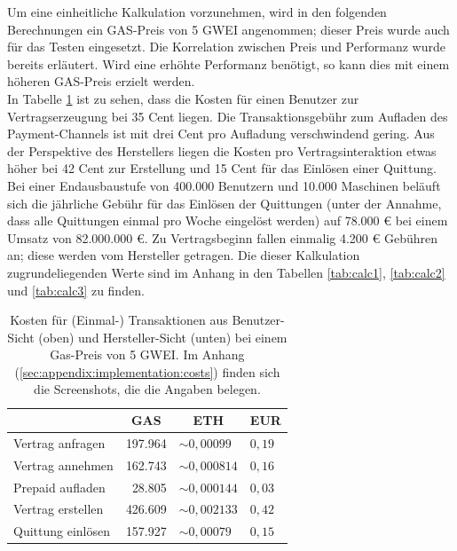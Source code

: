 Um eine einheitliche Kalkulation vorzunehmen, wird in den folgenden Berechnungen ein GAS-Preis von 5 GWEI angenommen; dieser Preis wurde auch für das Testen eingesetzt. Die Korrelation zwischen Preis und Performanz wurde bereits erläutert. Wird eine erhöhte Performanz benötigt, so kann dies mit einem höheren GAS-Preis erzielt werden.\\
In Tabelle \ref{tab:costs} ist zu sehen, dass die Kosten für einen Benutzer zur Vertragserzeugung bei 35 Cent liegen. Die Transaktionsgebühr zum Aufladen des Payment-Channels ist mit drei Cent pro Aufladung verschwindend gering. Aus der Perspektive des Herstellers liegen die Kosten pro Vertragsinteraktion etwas höher bei 42 Cent zur Erstellung und 15 Cent für das Einlösen einer Quittung. Bei einer Endausbaustufe von 400.000 Benutzern und 10.000 Maschinen beläuft sich die jährliche Gebühr für das Einlösen der Quittungen (unter der Annahme, dass alle Quittungen einmal pro Woche eingelöst werden) auf 78.000 € bei einem Umsatz von 82.000.000 €. Zu Vertragsbeginn fallen einmalig 4.200 € Gebühren an; diese werden vom Hersteller getragen. Die dieser Kalkulation zugrundeliegenden Werte sind im Anhang in den Tabellen \ref{tab:calc1}, \ref{tab:calc2} und \ref{tab:calc3} zu finden.\\

\begin{table}[h]
\caption[Kosten für (Einmal-) Transaktionen]{Kosten für (Einmal-) Transaktionen aus Benutzer-Sicht (oben) und Hersteller-Sicht (unten) bei einem Gas-Preis von 5 GWEI. Im Anhang (\ref{sec:appendix:implementation:costs}) finden sich die Screenshots, die die Angaben belegen.}
\label{tab:costs}
\centering
\begin{tabular}{@{}lrll@{}}
\toprule
\multicolumn{1}{c}{\textbf{}} & \multicolumn{1}{c}{\textbf{GAS}} & \multicolumn{1}{c}{\textbf{ETH}} & \multicolumn{1}{c}{\textbf{EUR}} \\ \midrule
Vertrag anfragen & 197.964 & $\sim 0,00099$ & $0,19$ \\
Vertrag annehmen & 162.743 & $\sim 0,000814$ & $0,16$ \\
Prepaid aufladen & 28.805 & $\sim 0,000144$ & $0,03$ \\ \bottomrule
Vertrag erstellen & 426.609 & $\sim 0,002133$ & $0,42$  \\
Quittung einlösen & 157.927 & $\sim 0,00079$ & $0,15$ \\ \bottomrule
\end{tabular}
\end{table}

